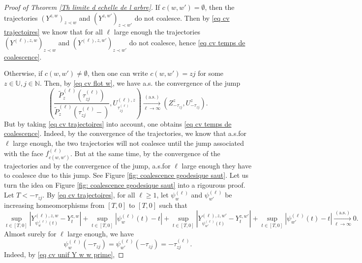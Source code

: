 \documentclass[11pt]{article}
\numberwithin{equation}{section}
\def \N{\mathbb{N}}
\def \U{\mathbb{U}}
\begin{document}
\begin{proof}[Proof of Theorem \ref{Th limite d echelle de l arbre}]
If $c(w,w')=\emptyset$, then the trajectories $(Y^{z,w})_{z \prec w} $ and $(Y^{z,w'})_{z\prec w'}$ do not coalesce. Then by \eqref{eq cv trajectoires} we know that for all $\ell$ large enough the trajectories $(Y^{(\ell),z,w})_{z \prec w} $ and $(Y^{(\ell),z,w'})_{z\prec w'}$ do not coalesce, hence \eqref{eq cv temps de coalescence}.

Otherwise, if $c(w,w')\neq \emptyset$, then one can write $c(w,w')= zj$ for some $z \in \U,j \in \N$. Then, by \eqref{eq cv flot w}, we have a.s. the convergence of the jump
\begin{equation}\label{eq cv saut coalescence}
\left(
\frac{\widetilde{P}^{(\ell)}_{z}(\tau_{zj}^{(\ell)})}{\widetilde{P}^{(\ell)}_{z}(\tau^{(\ell)}_{zj}-)}, U^{(\ell),z}_{\tau^{(\ell)}_{zj}}
\right)
\mathop{\longrightarrow}\limits_{\ell \to \infty}^{(\mathrm{a.s.})}
\left(Z^{z}_{-\tau_{zj}}, U^{z}_{-\tau_{zj}} \right).
\end{equation}
But by taking \eqref{eq cv trajectoires} into account, one obtains \eqref{eq cv temps de coalescence}. Indeed, by the convergence of the trajectories, we know that a.s.\@ for $\ell$ large enough, the two trajectories will not coalesce until the jump associated with the face $f^{(\ell)}_{c(w,w')}$. But at the same time, by the convergence of the trajectories and by the convergence of the jump, a.s.\@ for $\ell$ large enough they have to coalesce due to this jump. See Figure \ref{fig: coalescence geodesique saut}. Let us turn the idea on Figure \ref{fig: coalescence geodesique saut} into a rigourous proof. Let $T<-\tau_{zj}$. By \eqref{eq cv trajectoires}, for all $\ell \ge 1$, let $\psi_w^{(\ell)}$ and $\psi_{w'}^{(\ell)}$ be increasing homeomorphisms from $[T,0]$ to $[T,0]$ such that 
\begin{equation}\label{eq cv unif Y w w prime}
\sup_{t \in [T,0]} \left\vert Y^{(\ell), z, w}_{\psi_w^{(\ell)}(t)}  - Y^{z,w}_t\right\vert + \sup_{t \in [T,0]} \left\vert  \psi_w^{(\ell)}(t)-t\right\vert
+ \sup_{t \in [T,0]} \left\vert Y^{(\ell), z, w'}_{\psi_{w'}^{(\ell)}(t)}  - Y^{z,w'}_t\right\vert + \sup_{t \in [T,0]} \left\vert  \psi_{w'}^{(\ell)}(t)-t\right\vert
\mathop{\longrightarrow}\limits_{\ell \to \infty}^{(\mathrm{a.s.})} 0.
\end{equation}
Almost surely for $\ell$ large enough, we have
\begin{equation}\label{eq identite temps de coalescence}
\psi_w^{(\ell)}(-\tau_{zj}) = \psi_{w'}^{(\ell)}(-\tau_{zj}) = -\tau^{(\ell)}_{zj}.
\end{equation}
Indeed, by \eqref{eq cv unif Y w w prime},

\end{proof}
\end{document}
